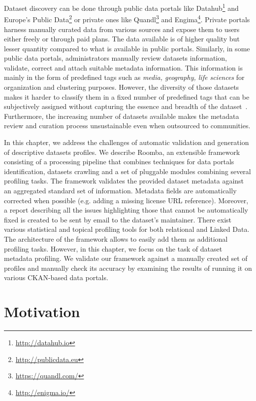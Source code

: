 Dataset discovery can be done through public data portals like Datahub\footnote{\url{http://datahub.io}} and Europe's Public Data\footnote{\url{http://publicdata.eu}} or private ones like Quandl\footnote{\url{https://quandl.com/}} and Engima\footnote{\url{http://enigma.io/}}. Private portals harness manually curated data from various sources and expose them to users either freely or through paid plans. The data available is of higher quality but lesser quantity compared to what is available in public portals. Similarly, in some public data portals, administrators manually review datasets information, validate, correct and attach suitable metadata information. This information is mainly in the form of predefined tags such as \textit{media, geography, life sciences} for organization and clustering purposes. However, the diversity of those datasets makes it harder to classify them in a fixed number of predefined tags that can be subjectively assigned without capturing the essence and breadth of the dataset~\cite{Lalithsena:WI:13}. Furthermore, the increasing number of datasets available makes the metadata review and curation process unsustainable even when outsourced to communities.

In this chapter, we address the challenges of automatic validation and generation of descriptive datasets profiles. We describe Roomba, an extensible framework consisting of a processing pipeline that combines techniques for data portals identification, datasets crawling and a set of pluggable modules combining several profiling tasks. The framework validates the provided dataset metadata against an aggregated standard set of information. Metadata fields are automatically corrected when possible (e.g. adding a missing license URL reference). Moreover, a report describing all the issues highlighting those that cannot be automatically fixed is created to be sent by email to the dataset's maintainer. There exist various statistical and topical profiling tools for both relational and Linked Data. The architecture of the framework allows to easily add them as additional profiling tasks. However, in this chapter, we focus on the task of dataset metadata profiling. We validate our framework against a manually created set of profiles and manually check its accuracy by examining the results of running it on various CKAN-based data portals.


\section{Motivation}


